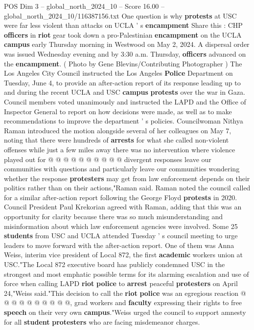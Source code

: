 \begin{textsample}{POS Dim 3 – global\_north\_2024\_10 – Score 16.00 – global\_north\_2024\_10/116387156.txt}  \label{ex:f3_pos_158}
One question is why \textbf{protests} at USC were far less violent than attacks on UCLA ' s \textbf{encampment} Share this : CHP \textbf{officers} in \textbf{riot} gear took down a pro-Palestinian \textbf{encampment} on the UCLA \textbf{campus} early Thursday morning in Westwood on May 2, 2024.
A dispersal order was issued Wednesday evening and by 3:30 a.m.
Thursday, \textbf{officers} advanced on the \textbf{encampment}. ( Photo by Gene Blevins/Contributing Photographer ) The Los Angeles City Council instructed the Los Angeles \textbf{Police} Department on Tuesday, June 4, to provide an after-action report of its response leading up to and during the recent UCLA and USC \textbf{campus} \textbf{protests} over the war in Gaza.
Council members voted unanimously and instructed the LAPD and the Office of Inspector General to report on how decisions were made, as well as to make recommendations to improve the department ' s policies.
Councilwoman Nithya Raman introduced the motion alongside several of her colleagues on May 7, noting that there were hundreds of \textbf{arrests} for what she called non-violent offenses while just a few miles away there was no intervention where violence played out for @ @ @ @ @ @ @ @ @ @ divergent responses leave our communities with questions and particularly leave our communities wondering whether the response \textbf{protesters} may get from law enforcement depends on their politics rather than on their actions,"Raman said.
Raman noted the council called for a similar after-action report following the George Floyd \textbf{protests} in 2020.
Council President Paul Krekorian agreed with Raman, adding that this was an opportunity for clarity because there was so much misunderstanding and misinformation about which law enforcement agencies were involved.
Some 25 \textbf{students} from USC and UCLA attended Tuesday ' s council meeting to urge leaders to move forward with the after-action report.
One of them was Anna Weiss, interim vice president of Local 872, the first \textbf{academic} workers union at USC."The Local 872 executive board has publicly condemned USC in the strongest and most emphatic possible terms for its alarming escalation and use of force when calling LAPD \textbf{riot} \textbf{police} to \textbf{arrest} peaceful \textbf{protesters} on April 24,"Weiss said."This decision to call the \textbf{riot} \textbf{police} was an egregious reaction @ @ @ @ @ @ @ @ @ @, grad workers and \textbf{faculty} expressing their rights to free \textbf{speech} on their very own \textbf{campus}."Weiss urged the council to support amnesty for all \textbf{student} \textbf{protesters} who are facing misdemeanor charges.

\end{textsample}
